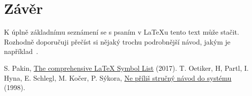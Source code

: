 \documentclass{article}
\begin{document}
	\section{Závěr}
		K úplně základnímu seznámení se s psaním v \LaTeX u tento text může stačit.
		Rozhodně doporučuji přečíst si nějaký trochu podrobnější návod, jakým je například~\cite{ref:UvodLaTeX}.

	\begin{thebibliography}{99}
		 S. Pakin, \href{http://tug.ctan.org/info/symbols/comprehensive/symbols-a4.pdf}{The comprehensive \LaTeX{} Symbol List} (2017).
		 T. Oetiker, H, Partl, I. Hyna, E. Schlegl, M. Kočer, P. Sýkora,
			\href{http://www.penguin.cz/~kocer/texty/lshort2e/lshort2e-cz.pdf}{Ne příliš stručný návod do systému \LaTeXe} (1998).
	\end{thebibliography}

	\tableofcontents
\end{document}
